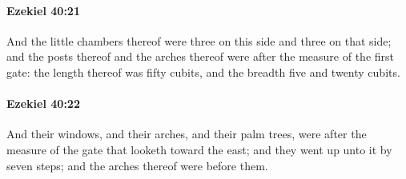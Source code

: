 		\paragraph{Ezekiel 40:21} %
			\label{EZEKIEL-40-21}

			And the little chambers thereof were three on this side and three on that side; and the posts thereof and the arches thereof were after the measure of the first gate: the length thereof was fifty cubits, and the breadth five and twenty cubits.


		\paragraph{Ezekiel 40:22} %
			\label{EZEKIEL-40-22}

			And their windows, and their arches, and their palm trees, were after the measure of the gate that looketh toward the east; and they went up unto it by seven steps; and the arches thereof were before them.

